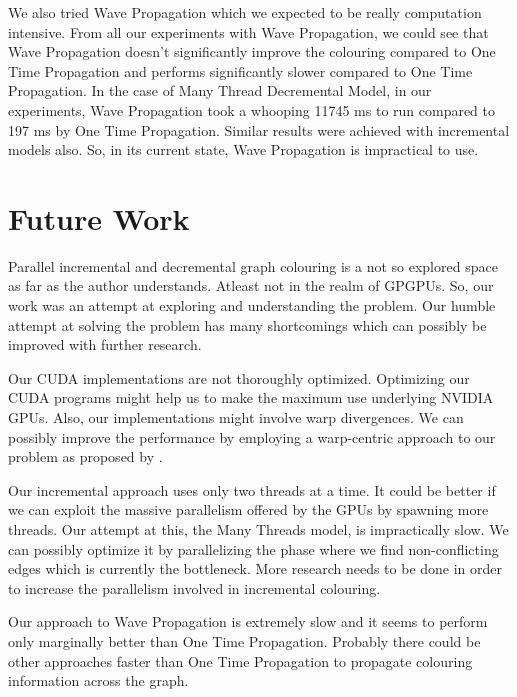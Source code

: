 \documentclass[MTech]{iitmdiss}
\begin{document}
We also tried Wave Propagation which we expected to be really computation intensive. From all our experiments with Wave Propagation, we could see that Wave Propagation doesn't significantly improve the colouring compared to One Time Propagation and performs significantly slower compared to One Time Propagation. In the case of Many Thread Decremental Model, in our experiments, Wave Propagation took a whooping 11745 ms to run compared to 197 ms by One Time Propagation. Similar results were achieved with incremental models also. So, in its current state, Wave Propagation is impractical to use.

\section{Future Work}
Parallel incremental and decremental graph colouring is a not so explored space as far as the author understands. Atleast not in the realm of GPGPUs. So, our work was an attempt at exploring and understanding the problem. Our humble attempt at solving the problem has many shortcomings which can possibly be improved with further research.

Our CUDA implementations are not thoroughly optimized. Optimizing our CUDA programs might help us to make the maximum use underlying NVIDIA GPUs. Also, our implementations might involve warp divergences. We can possibly improve the performance by employing a warp-centric approach to our problem as proposed by \citet{Hong:2011:ACG:2038037.1941590}.

Our incremental approach uses only two threads at a time. It could be better if we can exploit the massive parallelism offered by the GPUs by spawning more threads. Our attempt at this, the Many Threads model, is impractically slow. We can possibly optimize it by parallelizing the phase where we find non-conflicting edges which is currently the bottleneck. More research needs to be done in order to increase the parallelism involved in incremental colouring.

Our approach to Wave Propagation is extremely slow and it seems to perform only marginally better than One Time Propagation. Probably there could be other approaches faster than One Time Propagation to propagate colouring information across the graph.

 



%
%
\end{document}
